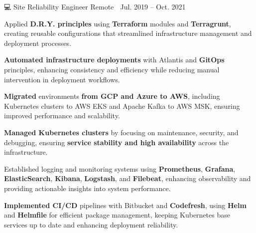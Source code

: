 {\begin{cventries}
        {💻 Site Reliability Engineer} %
        {Remote 📍} %
        {Jul. 2019 – Oct. 2021 📆} %
        {\begin{cvitems}
                \item{Applied \textbf{D.R.Y. principles} using \textbf{Terraform} modules and \textbf{Terragrunt}, creating reusable configurations that streamlined infrastructure management and deployment processes.}
                \item{\textbf{Automated infrastructure deployments} with Atlantis and \textbf{GitOps} principles, enhancing consistency and efficiency while reducing manual intervention in deployment workflows.}
                \item{\textbf{Migrated} environments \textbf{from GCP and Azure to AWS}, including Kubernetes clusters to AWS EKS and Apache Kafka to AWS MSK, ensuring improved performance and scalability.}
                \item{\textbf{Managed Kubernetes clusters} by focusing on maintenance, security, and debugging, ensuring \textbf{service stability and high availability} across the infrastructure.}
                \item{Established logging and monitoring systems using \textbf{Prometheus}, \textbf{Grafana}, \textbf{ElasticSearch}, \textbf{Kibana}, \textbf{Logstash}, and \textbf{Filebeat}, enhancing observability and providing actionable insights into system performance.}
                \item{\textbf{Implemented CI/CD} pipelines with Bitbucket and \textbf{Codefresh}, using \textbf{Helm} and \textbf{Helmfile} for efficient package management, keeping Kubernetes base services up to date and enhancing deployment reliability.}
                \\
                \newline
            \end{cvitems}}


\end{cventries}}
